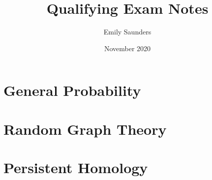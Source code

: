\documentclass{article}
\title{Qualifying Exam Notes}
\author{Emily Saunders}
\date{November 2020}
\theoremstyle{definition}
\theoremstyle{definition}
\theoremstyle{remark}
\begin{document}
\maketitle
\tableofcontents
\newpage

\section{General Probability}


\section{Random Graph Theory}


\section{Persistent Homology}

\end{document}

